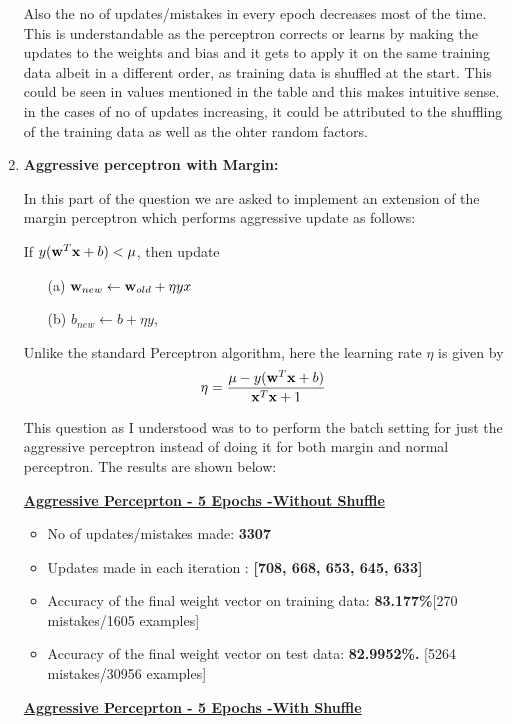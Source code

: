 \documentclass[12pt, fullpage,letterpaper]{article}
\newcommand{\bw}{{\bf w}}
\newcommand{\bx}{{\bf x}}
\begin{document}
\begin{enumerate}
	Also the no of updates/mistakes in every epoch decreases most of the time. This is understandable as the perceptron corrects or learns by making the updates to the weights and bias and it gets to apply it on the same training data albeit in a different order, as training data is shuffled at the start. This could be seen in values mentioned in the table and this makes intuitive sense. in the cases of no of updates increasing, it could be attributed to the shuffling of the training data as well as the ohter random factors.
	
	\item \textbf{ Aggressive perceptron with Margin:}
	
	In this part of the question we are asked to implement an extension of the margin perceptron which performs aggressive update as follows:
	
	If $y (\bw^T\bx + b) < \mu$, then update
	\begin{itemize}
		\item[(a)] $\bw_{new} \leftarrow \bw_{old} + \eta yx$
		\item[(b)] $b_{new} \leftarrow b + \eta y$,
	\end{itemize}
	Unlike the standard Perceptron algorithm, here the learning rate
	$\eta$ is given by
	$$\eta = \frac{\mu - y(\bw^T\bx + b)}{\bx^T\bx + 1}$$
	
	This question as I understood was to to perform the batch setting for just the aggressive perceptron instead of doing it for both margin and normal perceptron. The results are shown below:
	
	\item[] \textbf {\underline{ Aggressive Perceprton - 5 Epochs -Without Shuffle }}
	
	\begin{itemize}
		\item No of updates/mistakes made: \textbf{3307} 
		\item Updates made in each iteration :\textbf{ [708, 668, 653, 645, 633] } 
		\item Accuracy of the final weight vector on training data: \textbf{83.177\%}[270 mistakes/1605 examples]
		\item Accuracy of the final weight vector on test data: \textbf{82.9952\%.} [5264 mistakes/30956 examples]
	\end{itemize}
	
	\item[] \textbf {\underline{ Aggressive Perceprton - 5 Epochs -With Shuffle }}
	

\end{enumerate}
\end{document}

